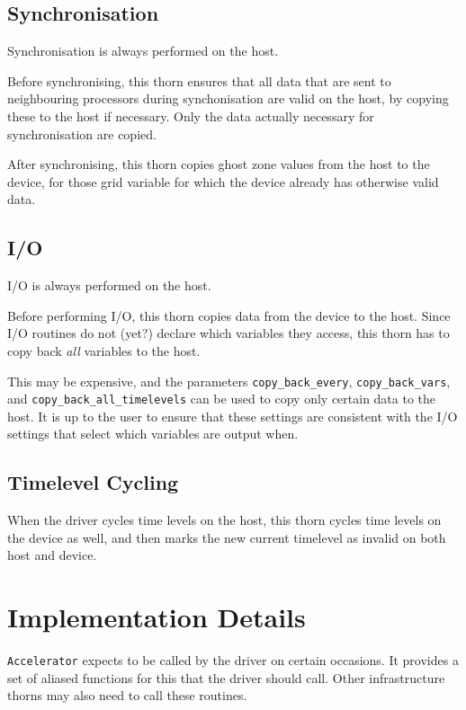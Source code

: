 \subsection{Synchronisation}

Synchronisation is always performed on the host.

Before synchronising, this thorn ensures that all data that are sent
to neighbouring processors during synchonisation are valid on the
host, by copying these to the host if necessary. Only the data
actually necessary for synchronisation are copied.

After synchronising, this thorn copies ghost zone values from the host
to the device, for those grid variable for which the device already
has otherwise valid data.



\subsection{I/O}

I/O is always performed on the host.

Before performing I/O, this thorn copies data from the device to the
host. Since I/O routines do not (yet?) declare which variables they
access, this thorn has to copy back \emph{all} variables to the host.

This may be expensive, and the parameters \texttt{copy\_back\_every},
\texttt{copy\_back\_vars}, and \texttt{copy\_back\_all\_timelevels}
can be used to copy only certain data to the host. It is up to the
user to ensure that these settings are consistent with the I/O
settings that select which variables are output when.



\subsection{Timelevel Cycling}

When the driver cycles time levels on the host, this thorn cycles time
levels on the device as well, and then marks the new current timelevel
as invalid on both host and device.



\section{Implementation Details}

\texttt{Accelerator} expects to be called by the driver on certain
occasions. It provides a set of aliased functions for this that the
driver should call. Other infrastructure thorns may also need to call
these routines.

